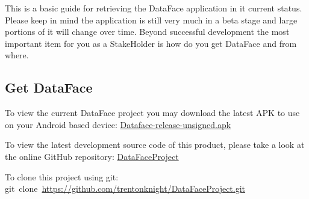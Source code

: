 \documentclass[fontsize=11pt, %
paper=a4, %
twoside, %
captions=tableheading,
index=totoc,
hyperref]{labbook}
\begin{document}
\pagestyle{scrheadings} %


\labday{\today}

\begin{onehalfspace}
This is a basic guide for retrieving the DataFace application in it current status. Please keep in mind the application is still very much in a beta stage and large portions of it will change over time. Beyond successful development the most important item for you as a StakeHolder is how do you get DataFace and from where.
\subsection{Get DataFace}
\end{onehalfspace}
\begin{mdframed}[roundcorner=10pt,leftmargin=1, rightmargin=1,
linecolor=green!40!brown!80,outerlinewidth=.9,
innerleftmargin=8,innertopmargin=8,innerbottommargin=8]
\begin{center}
\begin{minipage}[c]{1.0\textwidth}
To view the current DataFace project you may download the latest APK to use on your Android based device: \href{https://github.com/trentonknight/DataFaceProject/blob/master/DataFace/build/apk/DataFace-release-unsigned.apk?raw=true}{Dataface-release-unsigned.apk}
\end{minipage}
\end{center}
\end{mdframed}
\begin{mdframed}[roundcorner=10pt,leftmargin=1, rightmargin=1,
linecolor=green!40!brown!80,outerlinewidth=.9,
innerleftmargin=8,innertopmargin=8,innerbottommargin=8]
\begin{center}
\begin{minipage}[c]{1.0\textwidth}
To view the latest development source code of this product, please take a look at the online GitHub repository: \href{https://github.com/trentonknight/DataFaceProject}{DataFaceProject}
\end{minipage}
\end{center}
\end{mdframed}
\begin{mdframed}[roundcorner=10pt,leftmargin=1, rightmargin=1,
linecolor=green!40!brown!80,outerlinewidth=.9,
innerleftmargin=8,innertopmargin=8,innerbottommargin=8]
\begin{center}
\begin{minipage}[c]{1.0\textwidth}
To clone this project using git:\\ git~clone~\href{https://github.com/trentonknight/DataFaceProject.git}{https://github.com/trentonknight/DataFaceProject.git}
\end{minipage}
\end{center}
\end{mdframed}
\end{document}
